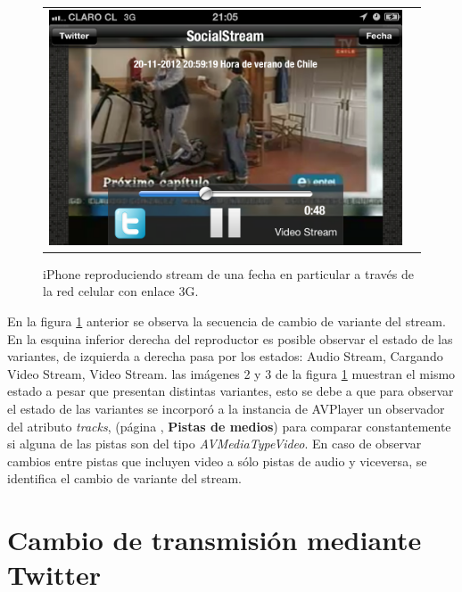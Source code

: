 \begin{figure}[H]
\begin{tabular}{cc}
	\includegraphics[scale=0.21]{imgs/cell-link-4.png} \\
	\end{tabular}
	\caption{iPhone reproduciendo stream de una fecha en particular a través de la red celular con enlace 3G.}
	\label{fig:cell-link}
\end{figure}

En la figura \ref{fig:cell-link} anterior se observa la secuencia de cambio de variante del stream. En la esquina inferior derecha del reproductor es posible observar el estado de las variantes, de izquierda a derecha pasa por los estados: Audio Stream, Cargando Video Stream, Video Stream. las imágenes 2 y 3 de la figura \ref{fig:cell-link} muestran el mismo estado a pesar que presentan distintas variantes, esto se debe a que para observar el estado de las variantes se  incorporó a la instancia de AVPlayer un observador del atributo \textit{tracks}, (página \pageref{item:kvo-tracks}, \textbf{Pistas de medios}) para comparar constantemente si alguna de las pistas son del tipo \textit{AVMediaTypeVideo}. 
En caso de observar cambios entre pistas que incluyen video a sólo pistas de audio y viceversa, se identifica el cambio de variante del stream.


\section{Cambio de transmisión mediante Twitter}

